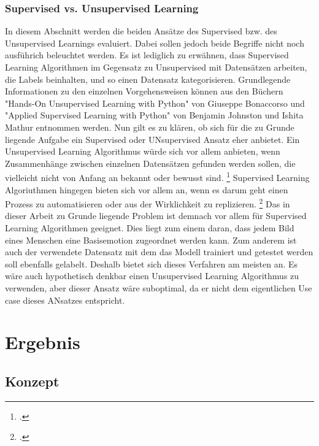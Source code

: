 \documentclass[12pt, a4paper]{scrbook}
\begin{document}
\subsection{Supervised vs. Unsupervised Learning}
In diesem Abschnitt werden die beiden Ansätze des Supervised bzw. des Unsupervised Learnings evaluiert. Dabei sollen jedoch beide Begriffe nicht noch ausführich beleuchtet werden. Es ist lediglich zu erwähnen, dass Supervised Learning Algorithmen im Gegensatz zu Unsupervised mit Datensätzen arbeiten, die Labels beinhalten, und so einen Datensatz kategorisieren.  Grundlegende Informationen zu den einzelnen Vorgehensweisen  können aus den Büchern "Hands-On Unsupervised Learning with Python" von Giuseppe Bonaccorso und "Applied Supervised Learning with Python" von Benjamin Johnston und Ishita Mathur entnommen werden.
Nun gilt es zu klären, ob sich für die zu Grunde liegende Aufgabe ein Supervised oder UNsupervised Ansatz eher anbietet. Ein Unsupervised Learning Algorithmus würde sich vor allem anbieten, wenn Zusammenhänge zwischen einzelnen Datensätzen gefunden werden sollen, die vielleicht nicht von Anfang an bekannt oder bewusst sind.
\footcite[Vgl. ][21]{Unsupervised}
 Supervised Learning Algoriuthmen hingegen bieten sich vor allem an, wenn es darum geht einen Prozess zu automatisieren oder aus der Wirklichkeit zu replizieren.
\footcite[Vgl. ][4]{Supervised}
Das in dieser Arbeit zu Grunde liegende Problem ist demnach vor allem für Supervised Learning Algorithmen geeignet. Dies liegt zum einem daran, dass jedem Bild eines Menschen eine Basisemotion zugeordnet werden kann. Zum anderem ist auch der verwendete Datensatz mit dem das Modell trainiert und getestet werden soll ebenfalls gelabelt. Deshalb bietet sich dieses Verfahren am meisten an. Es wäre auch hypothetisch denkbar einen Unsupervised Learning Algorithmus zu verwenden, aber dieser Ansatz wäre suboptimal, da er nicht dem eigentlichen Use case dieses ANsatzes entspricht.


\let\cleardoublepage\relax






\chapter{Ergebnis}


\section{Konzept}
\end{document}
